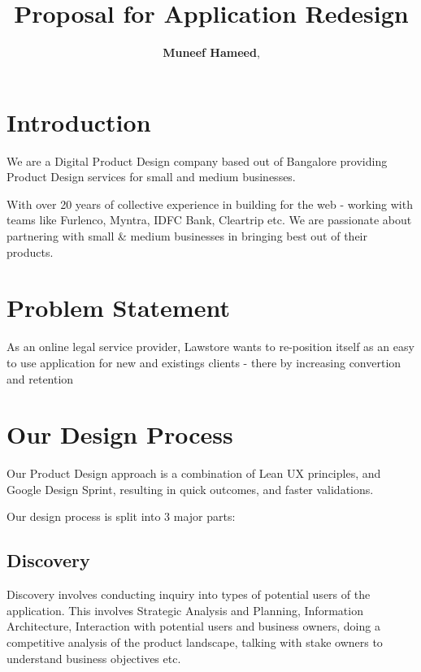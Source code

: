 \documentclass[a4paper,10pt]{article}
\title{Proposal for \newCommandCompanyName Application Redesign}
\author{\textbf{ Muneef Hameed}, \\ \newCommandOurCompany}
\newcommand{\newCommandCompanyName}{Lawstore }
\begin{document}
		
		\maketitle
		
		\vspace{4mm} %
		 
		
		\vfill
		
		\section{Introduction}
		
		We are a Digital Product Design company based out of Bangalore providing Product Design services for small and medium businesses. \newline
		
		With over 20 years of collective experience in building for the web - working with teams like Furlenco, Myntra, IDFC Bank, Cleartrip etc. We are passionate about partnering with small \& medium businesses in bringing best out of their products.
		
		\section{Problem Statement}
		As an online legal service provider, \newCommandCompanyName wants to re-position itself as an easy to use application for new and existings clients - there by increasing convertion and retention \\		
		
		\section{Our Design Process}
		
		Our Product Design approach is a combination of Lean UX principles, and Google Design Sprint, resulting in quick outcomes, and faster validations.\newline
		
		Our design process is split into 3 major parts:
		
		\subsection{Discovery}
		Discovery involves conducting inquiry into types of potential users of
		the application. This involves Strategic Analysis and Planning,
		Information Architecture, Interaction with potential users and business
		owners, doing a competitive analysis of the product landscape, talking
		with stake owners to understand business objectives etc.
		
\end{document}
